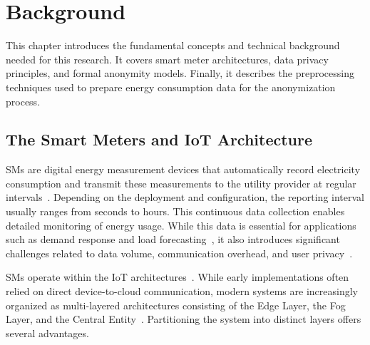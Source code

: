 \chapter{Background}

This chapter introduces the fundamental concepts and technical background needed for this research. It covers smart meter architectures, data privacy principles, and formal anonymity models. Finally, it describes the preprocessing techniques used to prepare energy consumption data for the anonymization process.


\section{The Smart Meters and IoT Architecture}
\label{sec:SMandIoT}

\Acp{SM} are digital energy measurement devices that automatically record electricity consumption and transmit these measurements to the utility provider at regular intervals~\cite{SmartMetersApplications}. Depending on the deployment and configuration, the reporting interval usually ranges from seconds to hours. This continuous data collection enables detailed monitoring of energy usage. While this data is essential for applications such as demand response and load forecasting~\cite{DemandResponseSurvey, DemandResponseBenefits}, it also introduces significant challenges related to data volume, communication overhead, and user privacy~\cite{RevealingHouseholdCharacteristicsSM, InferringPersonalInformationFromDRS}.

\Acp{SM} operate within the \ac{IoT} architectures~\cite{reviewIoT}. While early implementations often relied on direct device-to-cloud communication, modern systems are increasingly organized as multi-layered architectures consisting of the Edge Layer, the Fog Layer, and the Central Entity~\cite{edgecomputing, fogcomputing}. Partitioning the system into distinct layers offers several advantages. 

